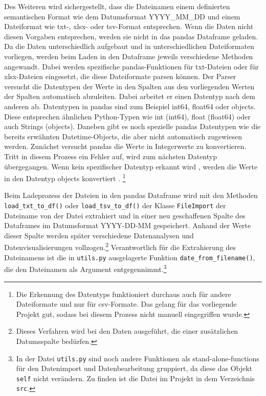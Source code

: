     Des Weiteren wird sichergestellt, dass die Dateinamen einem definierten semantischen Format wie dem Datumsformat YYYY\_MM\_DD und 
    einem Dateiformat wie txt-, xlsx- oder tsv-Format entsprechen. Wenn die Daten nicht diesen Vorgaben entsprechen, werden sie nicht in
    das pandas Dataframe geladen. Da die Daten unterschiedlich aufgebaut und in unterschiedlichen Dateiformaten vorliegen, 
    werden beim Laden in den Dataframe jeweils verschiedene Methoden angewandt. Dabei werden spezifische pandas-Funktionen für 
    txt-Dateien oder für xlsx-Dateien eingesetzt, die diese Dateiformate parsen können. 
    Der Parser versucht die Datentypen der Werte in den Spalten aus den vorliegenden Werten der Spalten automatisch abzuleiten. 
    Dabei arbeitet er einen Datentyp nach dem anderen ab. Datentypen in pandas sind zum Beispiel int64, float64 oder objects. 
    Diese entsprechen ähnlichen Python-Typen wie int (int64), float (float64) oder auch Strings (objects). Daneben gibt es noch spezielle pandas Datentypen wie die bereits erwähnten Datetime-Objects, die aber nicht automatisch zugewiesen werden.
    Zunächst versucht pandas die Werte in Integerwerte zu konvertieren. Tritt in diesem Prozess ein Fehler auf, 
    wird zum nächsten Datentyp übergegangen. Wenn kein spezifischer Datentyp erkannt wird , werden die Werte in den Datentyp objects konvertiert \cite[Vgl.][]{golubin_how_2021}.
    \footnote{Die Erkennung des Datentyps funktioniert durchaus auch für andere Dateiformate und nur für csv-Formate. Das gelang für das vorliegende Projekt gut, sodass
    bei diesem Prozess nicht manuell eingegriffen wurde.}
    
    Beim Ladeprozess der Dateien in den pandas Dataframe wird mit den Methoden \texttt{load\_txt\_to\_df()} oder \texttt{load\_tsv\_to\_df()} 
    der Klasse \texttt{FileImport} der Dateiname von der Datei extrahiert und in einer neu geschaffenen Spalte des Dataframes im Datumsformat YYYY-DD-MM gespeichert.
    Anhand der Werte dieser Spalte werden später verschiedene Datenanalysen und Datenvisualisierungen vollzogen.\footnote{Dieses Verfahren wird bei den Daten ausgeführt, die einer zusätzlichen Datumsspalte bedürfen.} 
    Verantwortlich für die Extrahierung des Dateinamens ist die in \texttt{utils.py} ausgelagerte Funktion \texttt{date\_from\_filename()},
    die den Dateinamen als Argument entgegennimmt.\footnote{In der Datei \texttt{utils.py} sind noch andere Funktionen als stand-alone-functions für den Datenimport und Datenbearbeitung gruppiert,
    da diese das Objekt \texttt{self} nicht verändern. Zu finden ist die Datei im Projekt in dem Verzeichnis \texttt{src}.} 
    
